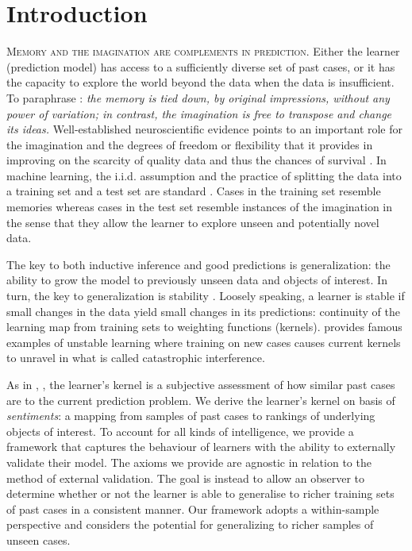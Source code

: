 \documentclass[ecta,nameyear,draft]{econsocart}
\newcommand{\gsii}{$\textup{GS03}$}
\theoremstyle{plain}
\theoremstyle{remark}
\begin{document}
\section{Introduction} \label{sec-introduction}
\textsc{Memory and the imagination are complements in
prediction}. Either the learner (prediction model) has access to a sufficiently
diverse set of past cases, or it has the capacity to explore the world beyond
the data when the data is insufficient.
To paraphrase \citep[pages 9 and 10]{hume1896treatise}: \emph{the memory is
  tied down, by original impressions, without any power of variation; in
contrast, the imagination is free to transpose and change its ideas.}
Well-established neuroscientific evidence points to an important role for the
imagination and the degrees of freedom or flexibility that it provides in
improving on the scarcity of quality data and thus the chances of survival
\citep{bartlett1932remembering,suddendorf2007evolution,mullally2013memory}. In
machine learning, the i.i.d. assumption and the practice of
splitting the data into a training set and a test set are standard
\citep{hastie2009elements}. Cases in the training set resemble memories whereas
cases in the test set resemble instances of the imagination in the sense that
they allow the learner to explore unseen and potentially novel data.

The key to both inductive inference and good predictions is generalization: the
ability to grow the model to previously unseen data and objects of interest. In
turn, the key to generalization is stability
\citep{bousquet2002stability,poggio2004general,mukherjee2006learning}. Loosely
speaking, a learner is stable if small changes in the data yield small changes
in its predictions: continuity of the learning map from training sets to
weighting functions (kernels).  \cite{mccloskey1989catastrophic} provides
famous examples of unstable learning where training on new cases causes current
kernels to unravel in what is called catastrophic interference.

As in \citet[henceforth, \gsii]{gilboa2003inductive},
\citet{billot2005probabilities,gilboa2006empirical,argenziano2019second}, the
learner's kernel is a subjective assessment of how similar past cases are to
the current prediction problem.  We derive the learner's kernel on basis of
\emph{sentiments}: a mapping from samples of past cases to rankings of
underlying objects of interest.  To account for all kinds of intelligence, we
provide a framework that captures the behaviour of learners with the ability to
externally validate their model. The axioms we provide are agnostic in relation
to the method of external validation. The goal is instead to allow an observer
to determine whether or not the learner is able to generalise to richer
training sets of past cases in a consistent manner. Our framework adopts a
within-sample perspective \citep[page 7, experiment
1]{chervonenkis2015recollections} and considers the potential for generalizing
to richer samples of unseen cases.
\end{document}
